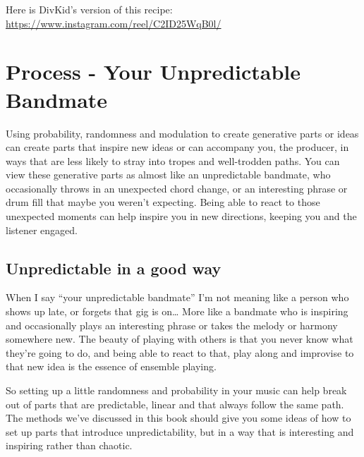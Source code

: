 \documentclass[
  12pt,
  letterpaper,
  oneside,
  open=any]{scrbook}
\begin{document}
Here is DivKid's version of this recipe:
\url{https://www.instagram.com/reel/C2ID25WqB0l/}


\chapter{Process - Your Unpredictable
Bandmate}\label{Chapter-023-Process-Your_Unpredictable_Bandmate}

\begin{tcolorbox}[enhanced jigsaw, colback=white, rightrule=.15mm, toprule=.15mm, arc=.35mm, opacitybacktitle=0.6, coltitle=black, leftrule=.75mm, bottomtitle=1mm, toptitle=1mm, left=2mm, bottomrule=.15mm, titlerule=0mm, colbacktitle=quarto-callout-tip-color!10!white, colframe=quarto-callout-tip-color-frame, title=\textcolor{quarto-callout-tip-color}{\faLightbulb}\hspace{0.5em}{Key idea}, breakable, opacityback=0]

Using probability, randomness and modulation to create generative parts
or ideas can create parts that inspire new ideas or can accompany you,
the producer, in ways that are less likely to stray into tropes and
well-trodden paths. You can view these generative parts as almost like
an unpredictable bandmate, who occasionally throws in an unexpected
chord change, or an interesting phrase or drum fill that maybe you
weren't expecting. Being able to react to those unexpected moments can
help inspire you in new directions, keeping you and the listener
engaged.

\end{tcolorbox}

\section{Unpredictable in a good way}\label{unpredictable-in-a-good-way}

When I say ``your unpredictable bandmate'' I'm not meaning like a person
who shows up late, or forgets that gig is on\ldots{} More like a
bandmate who is inspiring and occasionally plays an interesting phrase
or takes the melody or harmony somewhere new. The beauty of playing with
others is that you never know what they're going to do, and being able
to react to that, play along and improvise to that new idea is the
essence of ensemble playing.

So setting up a little randomness and probability in your music can help
break out of parts that are predictable, linear and that always follow
the same path. The methods we've discussed in this book should give you
some ideas of how to set up parts that introduce unpredictability, but
in a way that is interesting and inspiring rather than chaotic.
\end{document}
